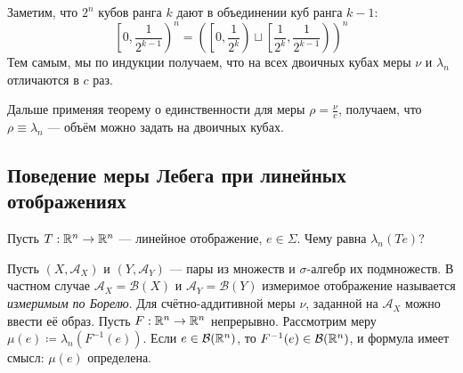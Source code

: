 \documentclass[a4paper]{report}
\begin{document}
{{{            Заметим, что $2^n$ кубов ранга $k$ дают в объединении куб ранга $k - 1$: \[\left[0, \frac1{2^{k-1}}\right)^n = \left(\left[0, \frac{1}{2^{k}}\right) \sqcup \left[\frac1{2^k}, \frac1{2^{k-1}}\right)\right)^n\]
            Тем самым, мы по индукции получаем, что на всех двоичных кубах меры $\nu$ и $\lambda_n$ отличаются в $c$ раз.

            Дальше применяя теорему о единственности для меры $\rho = \frac{\nu}{c}$, получаем, что $\rho \equiv \lambda_n$ --- объём можно задать на двоичных кубах.

        }
    }
    }

    \subsection{Поведение меры Лебега при линейных отображениях}
    Пусть $T: \mathbb{R}^n \rightarrow \mathbb{R}^n$ --- линейное отображение, $e \in \Sigma$.
    Чему равна $\lambda_n(Te)$?

    Пусть $(X, \mathcal{A}_X)$ и $(Y, \mathcal{A}_Y)$ --- пары из множеств и $\sigma$-алгебр их подмножеств.
    В частном случае $\mathcal{A}_X = \mathcal{B}(X)$ и $\mathcal{A}_Y = \mathcal{B}(Y)$ измеримое отображение называется \emph{измеримым по Борелю}.
    Для счётно-аддитивной меры $\nu$, заданной на $\mathcal{A}_X$ можно ввести её образ.
    Пусть $F: \mathbb{R}^n \rightarrow \mathbb{R}^n$ непрерывно.
    Рассмотрим меру $\mu(e) \coloneqq \lambda_n(F^{-1}(e))$.
    Если $e \in \mathcal{B}(\mathbb{R}^n)$, то $F^{-1}(e) \in \mathcal{B}(\mathbb{R}^n)$, и формула имеет смысл: $\mu(e)$ определена.
\end{document}
